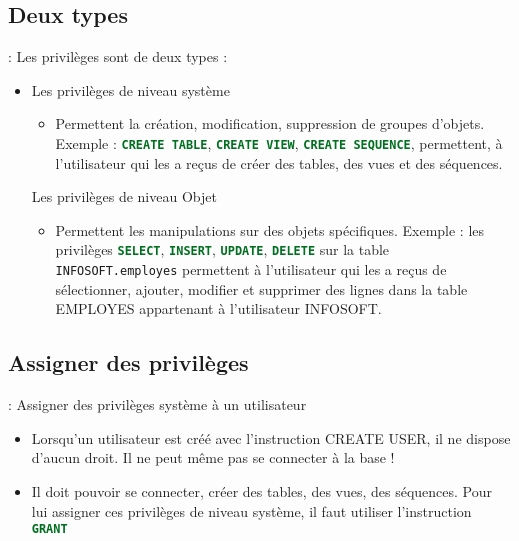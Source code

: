 \documentclass[10pt]{beamer}
\begin{document}
\subsection{Deux types}
\begin{frame}{\secname : \subsecname}
    Les privilèges sont de deux types :
    \begin{itemize}
        \item Les privilèges de niveau système
              \begin{itemize}
                  \item Permettent la création, modification, suppression de groupes d'objets.
                        Exemple : \lstinline[language=sql]!CREATE TABLE!, \lstinline[language=sql]!CREATE VIEW!, \lstinline[language=sql]!CREATE SEQUENCE!, permettent, à l'utilisateur qui les a reçus de créer des tables, des vues et des séquences.
              \end{itemize}
              Les privilèges de niveau Objet
              \begin{itemize}
                  \item Permettent les manipulations sur des objets spécifiques.
                        Exemple : les privilèges \lstinline[language=sql]!SELECT!, \lstinline[language=sql]!INSERT!, \lstinline[language=sql]!UPDATE!, \lstinline[language=sql]!DELETE! sur la table \lstinline[language=sql]!INFOSOFT.employes! permettent à l'utilisateur qui les a reçus de sélectionner, ajouter, modifier et supprimer des lignes dans la table EMPLOYES appartenant à l'utilisateur INFOSOFT.
              \end{itemize}
    \end{itemize}
\end{frame}
\subsection{Assigner des privilèges}
\begin{frame}{\secname : \subsecname}
    Assigner des privilèges système à un utilisateur
    \begin{itemize}
        \item Lorsqu'un utilisateur est créé avec l'instruction CREATE USER, il ne dispose d'aucun droit.  Il ne peut même pas se connecter à la base !
        \item Il doit pouvoir se connecter, créer des tables, des vues, des séquences.  Pour lui assigner ces privilèges de niveau système, il faut utiliser l'instruction \lstinline[language=sql]!GRANT!
    \end{itemize}
\end{frame}
\end{document}
